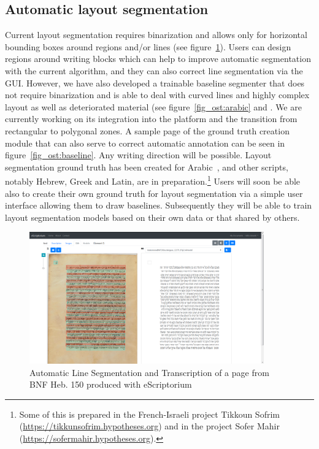 \subsection{Automatic layout segmentation}

Current layout segmentation requires binarization and allows only for
horizontal bounding boxes around regions and/or lines (see figure~\ref{fig_ost:automatic}). Users can
design regions around writing blocks which can help to improve automatic
segmentation with the current algorithm, and they can also correct line
segmentation via the GUI. However, we have also developed a trainable baseline
segmenter that does not require binarization and is able to deal with curved
lines and highly complex layout as well as deteriorated material (see figure~\ref{fig_ost:arabic}
and \cite{kiessling2019badam}. We are currently working on its integration into
the platform and the transition from rectangular to polygonal zones. A sample
page of the ground truth creation module that can also serve to correct
automatic annotation can
be seen in figure~\ref{fig_ost:baseline}. Any writing direction will be possible. Layout segmentation
ground truth has been created for Arabic~\cite{kiessling2019badam}, and other scripts, notably
Hebrew, Greek and Latin, are in preparation.\footnote{Some of this is prepared
in the French-Israeli project Tikkoun Sofrim
(\url{https://tikkunsofrim.hypotheses.org})
\cite{kuflik2019tikkoun,wecker2019tikkoun} and in the project Sofer Mahir
(\url{https://sofermahir.hypotheses.org}).} Users will soon be able also to
create their own ground truth for layout segmentation via a simple user
interface allowing them to draw baselines. Subsequently they will be able to
train layout segmentation models based on their own data or that shared by
others.

\begin{figure}[h]
	\centering
	\includegraphics[width=0.9\textwidth]{automatic_transcription_BNF_heb_150.png}
	\caption{Automatic Line Segmentation and Transcription of a page from BNF Heb. 150 produced with eScriptorium}
	\label{fig_ost:automatic}
\end{figure}

